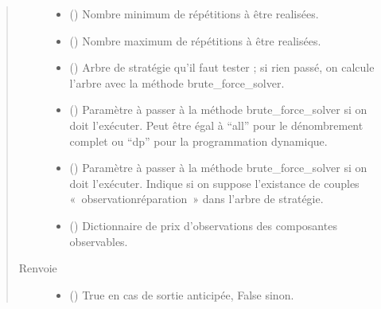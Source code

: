 \documentclass[letterpaper,10pt,french]{sphinxmanual}
\begin{document}
\begin{fulllineitems}
\begin{fulllineitems}
\begin{quote}
\begin{description}
\begin{itemize}
\item {} 
 () \textendash{} Nombre minimum de répétitions à être realisées.

\item {} 
 () \textendash{} Nombre maximum de répétitions à être realisées.

\item {} 
 ({\hyperref[\detokenize{index:StrategyTree.StrategyTree}]{}}\sphinxstyleliteralemphasis{\sphinxupquote{, }}) \textendash{} Arbre de stratégie qu’il faut tester ; si rien passé, on calcule
l’arbre avec la méthode brute\_force\_solver.

\item {} 
 (\sphinxstyleliteralemphasis{\sphinxupquote{, }}) \textendash{} Paramètre à passer à la méthode brute\_force\_solver si on doit
l’exécuter. Peut être égal à “all” pour le dénombrement complet ou
“dp” pour la programmation dynamique.

\item {} 
 (\sphinxstyleliteralemphasis{\sphinxupquote{, }}) \textendash{} Paramètre à passer à la méthode brute\_force\_solver si on doit
l’exécuter. Indique si on suppose l’existance de couples
« observation\sphinxhyphen{}réparation » dans l’arbre de stratégie.

\item {} 
 (\sphinxstyleliteralemphasis{\sphinxupquote{, }}) \textendash{} Dictionnaire de prix d’observations des composantes observables.

\end{itemize}

\item[{Renvoie}] \leavevmode
\begin{itemize}
\item {} 
 () \textendash{} True en cas de sortie anticipée, False sinon.


\end{itemize}
\end{description}
\end{quote}
\end{fulllineitems}
\end{fulllineitems}
\end{document}
